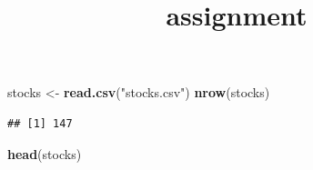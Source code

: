 \documentclass[
]{article}
\title{assignment}
\author{}
\date{\vspace{-2.5em}}
\newenvironment{Shaded}{\begin{snugshade}}{\end{snugshade}}
\newcommand{\KeywordTok}[1]{\textcolor[rgb]{0.13,0.29,0.53}{\textbf{#1}}}
\newcommand{\NormalTok}[1]{#1}
\newcommand{\StringTok}[1]{\textcolor[rgb]{0.31,0.60,0.02}{#1}}
\begin{document}
\maketitle

\begin{Shaded}
\begin{Highlighting}[]
\NormalTok{stocks <-}\StringTok{ }\KeywordTok{read.csv}\NormalTok{(}\StringTok{"stocks.csv"}\NormalTok{)}
\KeywordTok{nrow}\NormalTok{(stocks)}
\end{Highlighting}
\end{Shaded}

\begin{verbatim}
## [1] 147
\end{verbatim}

\begin{Shaded}
\begin{Highlighting}[]
\KeywordTok{head}\NormalTok{(stocks)}
\end{Highlighting}
\end{Shaded}
\end{document}
